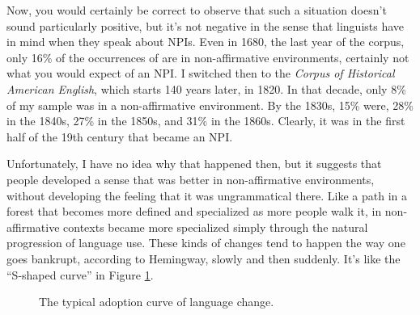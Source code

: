 Now, you would certainly be correct to observe that such a situation doesn't sound particularly positive, but it's not negative in the sense that linguists have in mind when they speak about NPIs. Even in 1680, the last year of the corpus, only 16\% of the occurrences of  are in non-affirmative environments, certainly not what you would expect of an NPI. I switched then to the \textit{Corpus of Historical American English}, which starts 140 years later, in 1820. In that decade, only 8\% of my sample was in a non-affirmative environment. By the 1830s, 15\% were, 28\% in the 1840s, 27\% in the 1850s, and 31\% in the 1860s. Clearly, it was in the first half of the 19th century that  became an NPI.

Unfortunately, I have no idea why that happened then, but it suggests that people developed a sense that  was better in non-affirmative environments, without developing the feeling that it was ungrammatical there. Like a path in a forest that becomes more defined and specialized as more people walk it,  in non-affirmative contexts became more specialized simply through the natural progression of language use. These kinds of changes tend to happen the way one goes bankrupt, according to Hemingway, slowly and then suddenly. It's like the \enquote{S-shaped curve} in Figure \ref{fig:sigmoid-function}.

\begin{figure}
    \centering
    \caption{The typical adoption curve of language change.}
    \label{fig:sigmoid-function}
\end{figure}

